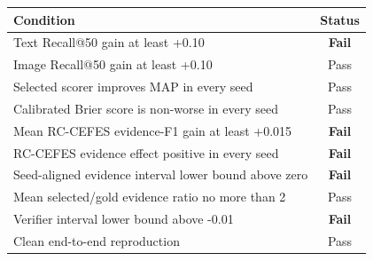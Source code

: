 \begin{tabular}{p{}c}
\toprule
Condition & Status \\
\midrule
Text Recall@50 gain at least +0.10 & \textbf{Fail} \\
Image Recall@50 gain at least +0.10 & Pass \\
Selected scorer improves MAP in every seed & Pass \\
Calibrated Brier score is non-worse in every seed & Pass \\
Mean RC-CEFES evidence-F1 gain at least +0.015 & \textbf{Fail} \\
RC-CEFES evidence effect positive in every seed & \textbf{Fail} \\
Seed-aligned evidence interval lower bound above zero & \textbf{Fail} \\
Mean selected/gold evidence ratio no more than 2 & Pass \\
Verifier interval lower bound above -0.01 & \textbf{Fail} \\
Clean end-to-end reproduction & Pass \\
\bottomrule
\end{tabular}
